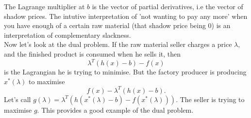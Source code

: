 \documentclass[a4paper]{scrartcl}
\begin{document}
The Lagrange multiplier at $b$ is the vector of partial derivatives, i.e the vector of shadow prices. The intutive interpretation of 'not wanting to pay any more' when you have enough of a certain raw material (that shadow price being 0) is an interpretation of complementary slackness.\newline \\
Now let's look at the dual problem. If the raw material seller charges a price $\lambda$, and the finished product is consumed when he sells it, then 
\[\lambda^T (h (x)-b)-f (x)\]
is the Lagrangian he is trying to minimise. But the factory producer is producing $x^*(\lambda)$ to maximise 
\[f(x)-\lambda^T (h (x)-b).\]
Let's call $g (\lambda)=\lambda^T (h (x^* (\lambda)-b)- f ( x^* (\lambda)))$. The seller is trying to maximise $g$. This provides a good example of the dual problem.
\end{document}
